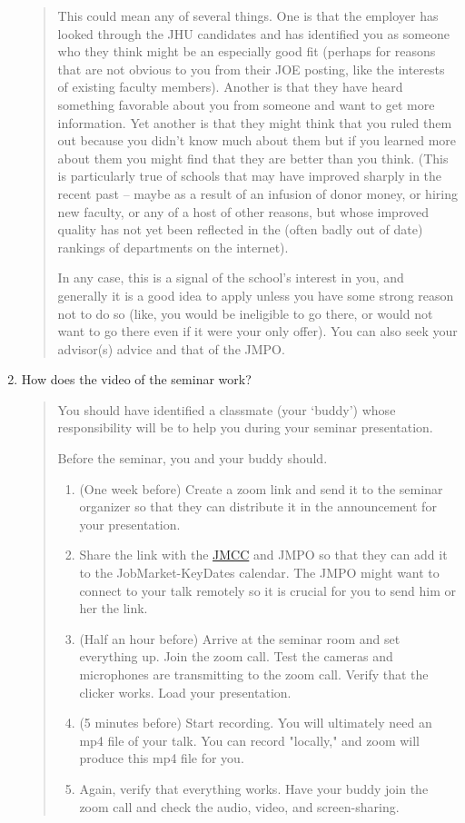\documentclass{\classes/econtex}
\begin{document}
\begin{enumerate}
  \begin{quote}
    This could mean any of several things.  One is that the employer has looked through the JHU candidates and has identified you as someone who they think might be an especially good fit (perhaps for reasons that are not obvious to you from their JOE posting, like the interests of existing faculty members).  Another is that they have heard something favorable about you from someone and want to get more information.  Yet another is that they might think that you ruled them out because you didn't know much about them but if you learned more about them you might find that they are better than you think.  (This is particularly true of schools that may have improved sharply in the recent past -- maybe as a result of an infusion of donor money, or hiring new faculty, or any of a host of other reasons, but whose improved quality has not yet been reflected in the (often badly out of date) rankings of departments on the internet).

    In any case, this is a signal of the school's interest in you, and generally it is a good idea to apply unless you have some strong reason not to do so (like, you would be ineligible to go there, or would not want to go there even if it were your only offer).  You can also seek your advisor(s) advice and that of the JMPO.


  \end{quote}

\hypertarget{record-and-post-your-job-talk}{}
\item  How does the video of the seminar work?
  
  \begin{quote}
    You should have identified a classmate (your `buddy') whose
    responsibility will be to help you during your seminar presentation.
    
    Before the seminar, you and your buddy should.
    \begin{enumerate}
    	\item (One week before) Create a zoom link and send it to the seminar organizer so that they can distribute it in the announcement for your presentation.
    	\item Share the link with the \href{\Notationpage}{JMCC} and JMPO so that they can add it to the JobMarket-KeyDates calendar. The JMPO might want to connect to your talk remotely so it is crucial for you to send him or her the link.
    	\item (Half an hour before) Arrive at the seminar room and set everything up. Join the zoom call. Test the cameras and microphones are transmitting to the zoom call. Verify that the clicker works. Load your presentation.
    	\item (5 minutes before) Start recording. You will ultimately need an mp4 file of your talk. You can record "locally," and zoom will produce this mp4 file for you.
    	\item Again, verify that everything works. Have your buddy join the zoom call and check the audio, video, and screen-sharing.
    \end{enumerate}
    

\end{quote}
\end{enumerate}
\end{document}
